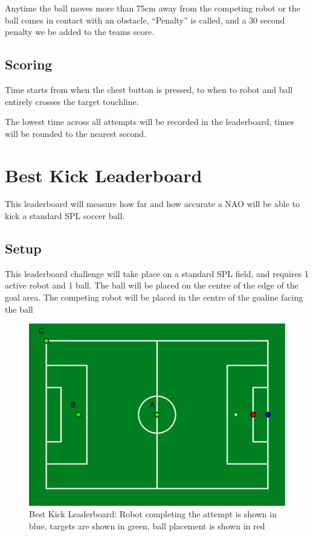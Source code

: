 Anytime the ball moves more than 75cm away from the competing robot or the ball comes in contact with
an obstacle,  ``Penalty'' is called, and a 30 second penalty we be added to the teams score.

\subsection{Scoring}
Time starts from when the chest button is pressed, to when to robot and ball entirely crosses the target touchline.

The lowest time across all attempts will be recorded in the leaderboard, times will be rounded to the nearest second.

\section{Best Kick Leaderboard}
This leaderboard will measure how far and how accurate a NAO will be able to kick a standard
SPL soccer ball.

\subsection{Setup}
This leaderboard challenge will take place on a standard SPL field, and requires 1 active robot and 1 ball.
The ball will be placed on the centre of the edge of the goal area.
The competing robot will be placed in the centre of the goaline facing the ball
\begin{figure}[t]
    \centerline{\includegraphics[width=\columnwidth]{figs/leaderboards/kick_leaderboard.pdf}}
    \caption{Best Kick Leaderboard: Robot completing the attempt is shown in blue, targets are shown in green, ball placement is shown in red}
    \label{fig:kick_leaderboard}
\end{figure}
